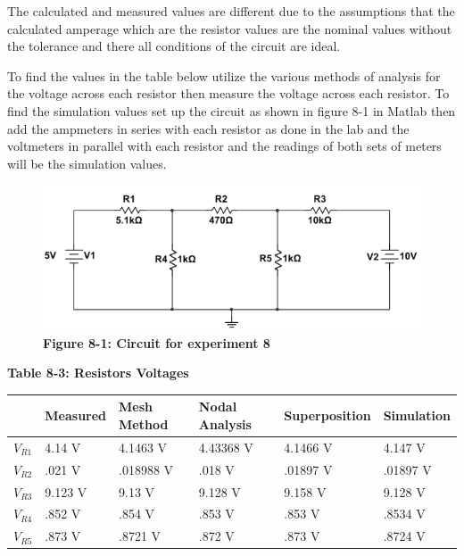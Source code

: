 \documentclass[a4paper]{article}
\begin{document}
The calculated and measured values are different due to the assumptions that the calculated amperage which are the resistor values are the nominal values without the 
tolerance and there all conditions of the circuit are ideal.

To find the values in the table below utilize the various methods of analysis for the voltage across each resistor then measure the voltage across each resistor. To find the 
simulation values set up the circuit as shown in figure 8-1 in Matlab then add the ampmeters in series with each resistor as done in the lab and the voltmeters 
in parallel with each resistor and the readings of both sets of meters will be the simulation values.
\vspace{.5 cm}
\begin{center}
    \begin{figure}[H]\label{fig8-2}
        \begin{center}
            \includegraphics[width = 16 cm]{fig8-1}\\
            \small\textbf{Figure 8-1: Circuit for experiment 8}\\    
        \end{center}
    \end{figure}
\end{center}

\begin{center}
    \small\textbf{Table 8-3: Resistors Voltages}
    \begin{tabular}{|p{2 cm}|p{2cm}|p{2 cm}|p{2 cm}|p{2 cm}|p{2 cm}|}
        \hline
         & Measured & Mesh Method & Nodal Analysis & Superposition & Simulation \\
        \hline
        $V_{R1}$ & 4.14 V & 4.1463 V & 4.43368 V & 4.1466 V & 4.147 V \\
        \hline
        $V_{R2}$ & .021 V & .018988 V & .018 V & .01897 V & .01897 V \\
        \hline
        $V_{R3}$ & 9.123 V & 9.13 V & 9.128 V & 9.158 V & 9.128 V \\
        \hline
        $V_{R4}$ & .852 V & .854 V & .853 V & .853 V & .8534 V \\
        \hline
        $V_{R5}$ & .873 V & .8721 V & .872 V & .873 V & .8724 V \\
        \hline
    \end{tabular}
\end{center}
\end{document}
